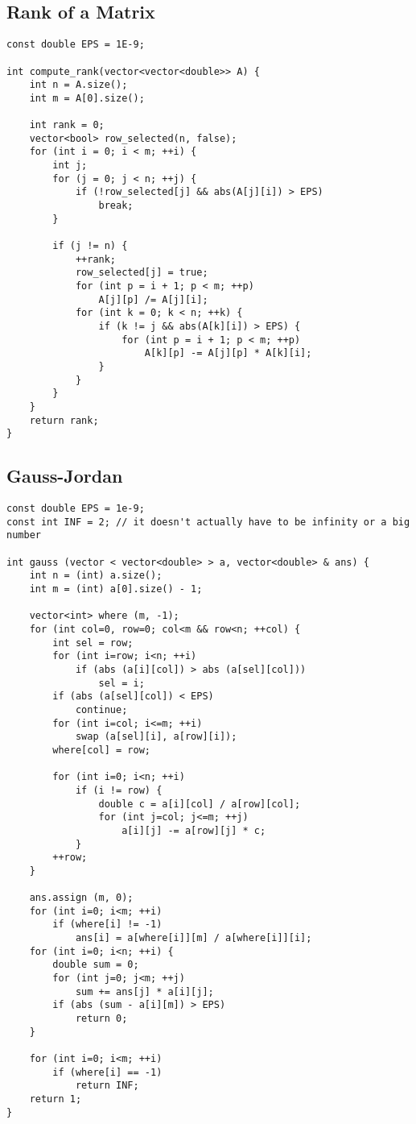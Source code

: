 \documentclass{article}
\begin{document}
\subsection{Rank of a Matrix}
\begin{lstlisting}
const double EPS = 1E-9;

int compute_rank(vector<vector<double>> A) {
    int n = A.size();
    int m = A[0].size();

    int rank = 0;
    vector<bool> row_selected(n, false);
    for (int i = 0; i < m; ++i) {
        int j;
        for (j = 0; j < n; ++j) {
            if (!row_selected[j] && abs(A[j][i]) > EPS)
                break;
        }

        if (j != n) {
            ++rank;
            row_selected[j] = true;
            for (int p = i + 1; p < m; ++p)
                A[j][p] /= A[j][i];
            for (int k = 0; k < n; ++k) {
                if (k != j && abs(A[k][i]) > EPS) {
                    for (int p = i + 1; p < m; ++p)
                        A[k][p] -= A[j][p] * A[k][i];
                }
            }
        }
    }
    return rank;
}

\end{lstlisting}


\subsection{Gauss-Jordan}

\begin{lstlisting}
const double EPS = 1e-9;
const int INF = 2; // it doesn't actually have to be infinity or a big number

int gauss (vector < vector<double> > a, vector<double> & ans) {
    int n = (int) a.size();
    int m = (int) a[0].size() - 1;

    vector<int> where (m, -1);
    for (int col=0, row=0; col<m && row<n; ++col) {
        int sel = row;
        for (int i=row; i<n; ++i)
            if (abs (a[i][col]) > abs (a[sel][col]))
                sel = i;
        if (abs (a[sel][col]) < EPS)
            continue;
        for (int i=col; i<=m; ++i)
            swap (a[sel][i], a[row][i]);
        where[col] = row;

        for (int i=0; i<n; ++i)
            if (i != row) {
                double c = a[i][col] / a[row][col];
                for (int j=col; j<=m; ++j)
                    a[i][j] -= a[row][j] * c;
            }
        ++row;
    }

    ans.assign (m, 0);
    for (int i=0; i<m; ++i)
        if (where[i] != -1)
            ans[i] = a[where[i]][m] / a[where[i]][i];
    for (int i=0; i<n; ++i) {
        double sum = 0;
        for (int j=0; j<m; ++j)
            sum += ans[j] * a[i][j];
        if (abs (sum - a[i][m]) > EPS)
            return 0;
    }

    for (int i=0; i<m; ++i)
        if (where[i] == -1)
            return INF;
    return 1;
}
\end{lstlisting}
\end{document}
